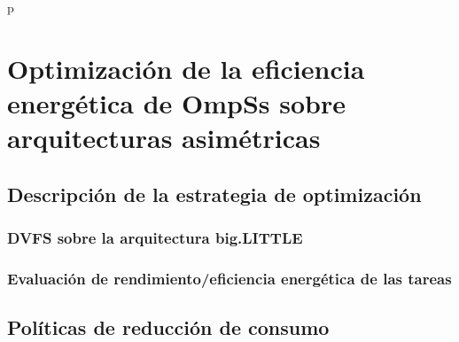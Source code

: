 p\cleardoublepage

\chapter{Optimización de la eficiencia energética de OmpSs sobre arquitecturas asimétricas}
\label{ch:chapter5}

\section{Descripción de la estrategia de optimización}

\subsection{DVFS sobre la arquitectura big.LITTLE}

\subsection{Evaluación de rendimiento/eficiencia energética de las tareas}


\section{Políticas de reducción de consumo}


